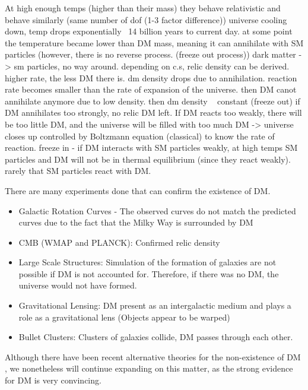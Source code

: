 \documentclass[12pt]{article}
\begin{document}
At high enough temps (higher than their mass) they behave relativistic and behave similarly (same number of dof (1-3 factor difference))
universe cooling down, temp drops exponentially ~14 billion years to current day.
at some point the temperature became lower than DM mass, meaning it can annihilate with SM particles (however, there is no reverse process. (freeze out process))
dark matter -> sm particles, no way around. depending on c.s, relic density can be derived. higher rate, the less DM there is.
dm density drops due to annihilation. reaction rate becomes smaller than the rate of expansion of the universe. then DM canot annihilate anymore due to low density. then dm density ~ constant (freeze out)
if DM annihilates too strongly, no relic DM left. If DM reacts too weakly, there will be too little DM, and the universe will be filled with too much DM -> universe closes up
controlled by Boltzmann equation (classical) to know the rate of reaction. 
freeze in - if DM interacts with SM particles weakly, at high temps SM particles and DM will not be in thermal equilibrium (since they react weakly). rarely that SM particles react with DM. 

There are many experiments done that can confirm the existence of DM.

\begin{itemize}
    \item Galactic Rotation Curves - The observed curves do not match the predicted curves due to the fact that the Milky Way is surrounded by DM
    \item CMB (WMAP and PLANCK): Confirmed relic density
    \item Large Scale Structures: Simulation of the formation of galaxies are not possible if DM is not accounted for. Therefore, if there was no DM, the universe would not have formed.
    \item Gravitational Lensing: DM present as an intergalactic medium and plays a role as a gravitational lens (Objects appear to be warped)
    \item Bullet Clusters: Clusters of galaxies collide, DM passes through each other.
\end{itemize}


Although there have been recent alternative theories for the non-existence of DM \cite{Gupta_2023, Gupta_2024}, we nonetheless will continue expanding on this matter, as the strong evidence for DM is very convincing.
\end{document}
